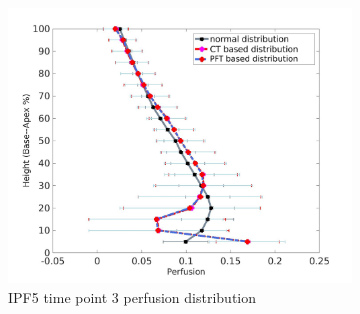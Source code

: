 \begin{figure}[htbp]
\begin{subfigure}{.6\linewidth}
  \includegraphics[width=\linewidth,trim={{.0\wd0} {.0\wd0} {.0\wd0} {.0\wd0}},clip]{Appendix/Image_AppexB/IPF513/IPF513_PerfusionAgainstLungHeight.png}
  \caption{IPF5 time point 3 perfusion distribution}
  \label{fig:IPF513VQDistribution-b}
\end{subfigure}
\begin{subfigure}{.6\linewidth}%

\end{subfigure}
\end{figure}
